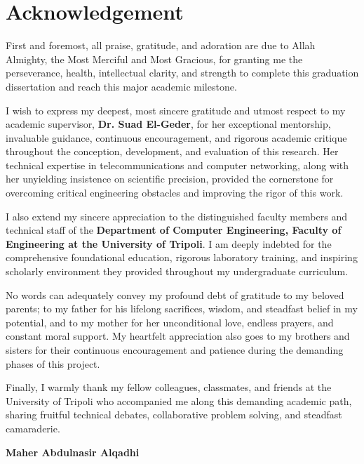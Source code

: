 \documentclass[12pt,a4paper,oneside]{report}
\begin{document}
\clearpage

\chapter*{Acknowledgement}

First and foremost, all praise, gratitude, and adoration are due to Allah Almighty, the Most Merciful and Most Gracious, for granting me the perseverance, health, intellectual clarity, and strength to complete this graduation dissertation and reach this major academic milestone.

I wish to express my deepest, most sincere gratitude and utmost respect to my academic supervisor, \textbf{Dr. Suad El-Geder}, for her exceptional mentorship, invaluable guidance, continuous encouragement, and rigorous academic critique throughout the conception, development, and evaluation of this research. Her technical expertise in telecommunications and computer networking, along with her unyielding insistence on scientific precision, provided the cornerstone for overcoming critical engineering obstacles and improving the rigor of this work.

I also extend my sincere appreciation to the distinguished faculty members and technical staff of the \textbf{Department of Computer Engineering, Faculty of Engineering at the University of Tripoli}. I am deeply indebted for the comprehensive foundational education, rigorous laboratory training, and inspiring scholarly environment they provided throughout my undergraduate curriculum.

No words can adequately convey my profound debt of gratitude to my beloved parents; to my father for his lifelong sacrifices, wisdom, and steadfast belief in my potential, and to my mother for her unconditional love, endless prayers, and constant moral support. My heartfelt appreciation also goes to my brothers and sisters for their continuous encouragement and patience during the demanding phases of this project.

Finally, I warmly thank my fellow colleagues, classmates, and friends at the University of Tripoli who accompanied me along this demanding academic path, sharing fruitful technical debates, collaborative problem solving, and steadfast camaraderie.

\vspace{1.5cm}
\noindent
\textbf{Maher Abdulnasir Alqadhi}
\end{document}
